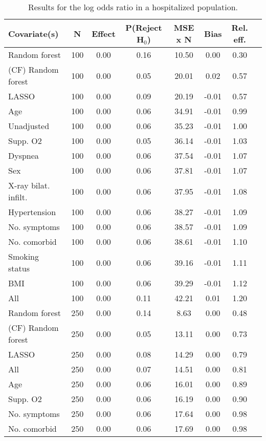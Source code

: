 \documentclass{article}
\begin{document}
\clearpage

{\tabcolsep=6pt  %
\begin{longtable}{lccccccc}
\caption{Results for the log odds ratio in a hospitalized population.} \\
Covariate(s) & N & Effect & P(Reject H$_0$) & MSE x N & Bias & Rel. eff.\\ \midrule
Random forest & 100 & 0.00 & 0.16 & 10.50 &  0.00 & 0.30 \\ 
(CF) Random forest & 100 & 0.00 & 0.05 & 20.01 &  0.02 & 0.57 \\ 
LASSO & 100 & 0.00 & 0.09 & 20.19 & -0.01 & 0.57 \\ 
Age & 100 & 0.00 & 0.06 & 34.91 & -0.01 & 0.99 \\ 
Unadjusted & 100 & 0.00 & 0.06 & 35.23 & -0.01 & 1.00 \\ 
Supp. O2 & 100 & 0.00 & 0.05 & 36.14 & -0.01 & 1.03 \\ 
Dyspnea & 100 & 0.00 & 0.06 & 37.54 & -0.01 & 1.07 \\ 
Sex & 100 & 0.00 & 0.06 & 37.81 & -0.01 & 1.07 \\ 
X-ray bilat. infilt. & 100 & 0.00 & 0.06 & 37.95 & -0.01 & 1.08 \\ 
Hypertension & 100 & 0.00 & 0.06 & 38.27 & -0.01 & 1.09 \\ 
No. symptoms & 100 & 0.00 & 0.06 & 38.57 & -0.01 & 1.09 \\ 
No. comorbid & 100 & 0.00 & 0.06 & 38.61 & -0.01 & 1.10 \\ 
Smoking status & 100 & 0.00 & 0.06 & 39.16 & -0.01 & 1.11 \\ 
BMI & 100 & 0.00 & 0.06 & 39.29 & -0.01 & 1.12 \\ 
All & 100 & 0.00 & 0.11 & 42.21 &  0.01 & 1.20 \\ \midrule() 
Random forest & 250 & 0.00 & 0.14 &  8.63 &  0.00 & 0.48 \\ 
(CF) Random forest & 250 & 0.00 & 0.05 & 13.11 &  0.00 & 0.73 \\ 
LASSO & 250 & 0.00 & 0.08 & 14.29 &  0.00 & 0.79 \\ 
All & 250 & 0.00 & 0.07 & 14.51 &  0.00 & 0.81 \\ 
Age & 250 & 0.00 & 0.06 & 16.01 &  0.00 & 0.89 \\ 
Supp. O2 & 250 & 0.00 & 0.06 & 16.19 &  0.00 & 0.90 \\ 
No. symptoms & 250 & 0.00 & 0.06 & 17.64 &  0.00 & 0.98 \\ 
No. comorbid & 250 & 0.00 & 0.06 & 17.69 &  0.00 & 0.98 \\ 

\end{longtable}}
\end{document}
